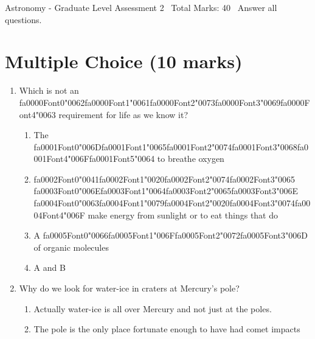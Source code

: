 \documentclass[12pt]{article}
\begin{document}
\begin{center}
Astronomy - Graduate Level Assessment 2 \
Total Marks: 40 \
Answer all questions.
\end{center}

\section*{Multiple Choice (10 marks)}
\begin{enumerate}[label=\arabic*.]
\item Which is not an {\csname fa0000Font0\endcsname\char"0062}{\csname fa0000Font1\endcsname\char"0061}{\csname fa0000Font2\endcsname\char"0073}{\csname fa0000Font3\endcsname\char"0069}{\csname fa0000Font4\endcsname\char"0063} requirement for life as we know it?
\begin{enumerate}[label=(\alph*)]
    \item The {\csname fa0001Font0\endcsname\char"006D}{\csname fa0001Font1\endcsname\char"0065}{\csname fa0001Font2\endcsname\char"0074}{\csname fa0001Font3\endcsname\char"0068}{\csname fa0001Font4\endcsname\char"006F}{\csname fa0001Font5\endcsname\char"0064} to breathe oxygen
    \item {\csname fa0002Font0\endcsname\char"0041}{\csname fa0002Font1\endcsname\char"0020}{\csname fa0002Font2\endcsname\char"0074}{\csname fa0002Font3\endcsname\char"0065} {\csname fa0003Font0\endcsname\char"006E}{\csname fa0003Font1\endcsname\char"0064}{\csname fa0003Font2\endcsname\char"0065}{\csname fa0003Font3\endcsname\char"006E} {\csname fa0004Font0\endcsname\char"0063}{\csname fa0004Font1\endcsname\char"0079}{\csname fa0004Font2\endcsname\char"0020}{\csname fa0004Font3\endcsname\char"0074}{\csname fa0004Font4\endcsname\char"006F} make energy from sunlight or to eat things that do
    \item A {\csname fa0005Font0\endcsname\char"0066}{\csname fa0005Font1\endcsname\char"006F}{\csname fa0005Font2\endcsname\char"0072}{\csname fa0005Font3\endcsname\char"006D} of organic molecules
    \item A and B
\end{enumerate}
\item Why do we look for water-ice in craters at Mercury's pole?
\begin{enumerate}[label=(\alph*)]
    \item Actually water-ice is all over Mercury and not just at the poles.
    \item The pole is the only place fortunate enough to have had comet impacts

\end{enumerate}
\end{enumerate}
\end{document}
